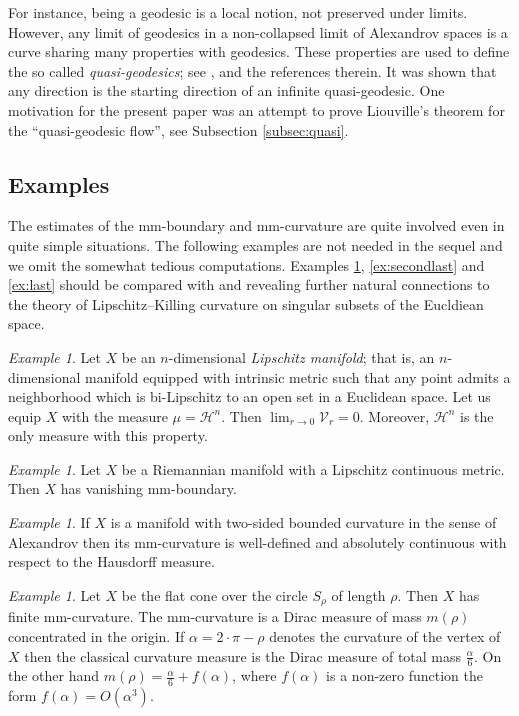 \documentclass[12pt,leqno,intlimits]{amsart}
\numberwithin{equation}{section}
\theoremstyle{definition}
\theoremstyle{remark}
\newtheorem{ex}[thm]{Example}
\begin{document}
For instance, being a geodesic is a local notion, not preserved under limits.
However, any limit of geodesics in a non-collapsed limit of Alexandrov spaces is a curve sharing many properties with geodesics.
These properties are used to define the so called \emph{quasi-geodesics};
see \cite{PP}, \cite{Petsemi} and the references therein.
It was shown that any direction is the starting direction of an infinite quasi-geodesic.
One motivation for the present paper was an attempt to prove Liouville's theorem for the ``quasi-geodesic flow'', see Subsection \ref{subsec:quasi}.

\subsection{Examples} \label{subsec:example}
The estimates of the mm-boundary and mm-curvature are quite involved even in quite simple situations.
The following examples are not needed in the sequel and we omit the somewhat tedious computations. Examples \ref{ex:cone}, \ref{ex:secondlast} and \ref{ex:last} should be compared with
\cite{Bernig-CAT} and \cite{Bernig-Alex} revealing further natural connections to the theory of Lipschitz--Killing curvature on singular subsets of the Eucldiean space.

\begin{ex} Let $X$ be an $n$-dimensional \emph{Lipschitz manifold}; that is, an $n$-dimensional manifold equipped with intrinsic metric such that any point admits a neighborhood which is bi-Lipschitz to an open set in a Euclidean space.
Let us equip $X$ with the measure $\mu=\mathcal H^n$.
Then $\lim _{r\to 0} \mathcal{V}_r =0$. Moreover, $\mathcal H^n$ is the only measure with this property.
\end{ex}

\begin{ex}
Let $X$ be a Riemannian manifold with a Lipschitz continuous metric.
Then $X$ has vanishing  mm-boundary.
\end{ex}

\begin{ex}
If $X$ is a manifold with two-sided bounded curvature in the sense of Alexandrov then its mm-curvature is well-defined and absolutely continuous with respect to the Hausdorff measure.
\end{ex}

\begin{ex} \label{ex:cone}
Let $X$ be the flat cone over the circle $S_{\rho}$ of length $\rho$.
Then $X$ has finite mm-curvature. The mm-curvature is a Dirac measure of mass $m(\rho)$ concentrated in the origin.
If $\alpha =2{\cdot}\pi-\rho$ denotes the curvature of the vertex of $X$ then the classical curvature measure is the Dirac measure of total mass
$\frac \alpha 6$. On the other hand $m(\rho)= \frac \alpha 6 + f(\alpha)$, where
$f(\alpha)$ is a non-zero function the form $f(\alpha)= O(\alpha ^3)$.
\end{ex}
\end{document}
